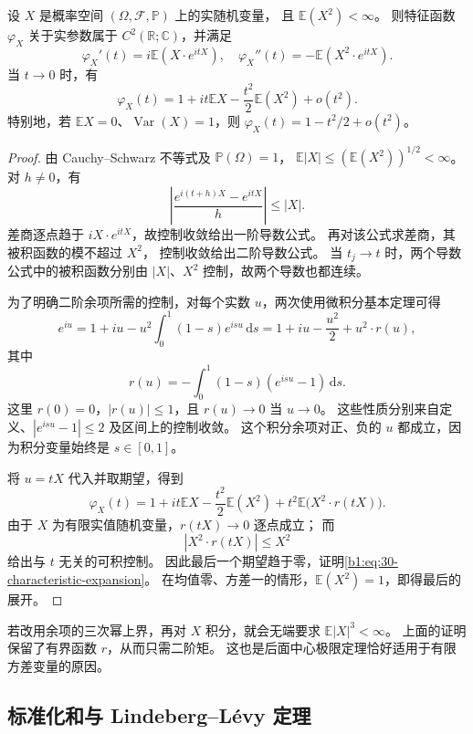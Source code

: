 \begin{proposition}\label{b1:prop:30-characteristic-second-order}
设 \(X\) 是概率空间 \((\Omega,\mathcal F,\mathbb P)\) 上的实随机变量，
且 \(\mathbb E(X^2)<\infty\)。
则特征函数 \(\varphi_X\) 关于实参数属于 \(C^2(\mathbb R;\mathbb C)\)，并满足
\[
 \varphi_X'(t)=i\mathbb E(X\cdot e^{itX}),
 \quad
 \varphi_X''(t)=-\mathbb E(X^2\cdot e^{itX}).
\]
当 \(t\to0\) 时，有
\begin{equation}\label{b1:eq:30-characteristic-expansion}
 \varphi_X(t)
 =1+it\mathbb EX-\frac{t^2}{2}\mathbb E(X^2)+o(t^2).
\end{equation}
特别地，若 \(\mathbb EX=0\)、\(\operatorname{Var}(X)=1\)，则
\(\varphi_X(t)=1-t^2/2+o(t^2)\)。
\end{proposition}
\begin{proof}
由 Cauchy--Schwarz 不等式及 \(\mathbb P(\Omega)=1\)，
\(\mathbb E|X|\leq(\mathbb E(X^2))^{1/2}<\infty\)。
对 \(h\ne0\)，有
\[
 \left|\frac{e^{i(t+h)X}-e^{itX}}{h}\right|\leq|X|.
\]
差商逐点趋于 \(iX\cdot e^{itX}\)，故控制收敛给出一阶导数公式。
再对该公式求差商，其被积函数的模不超过 \(X^2\)，
控制收敛给出二阶导数公式。
当 \(t_j\to t\) 时，两个导数公式中的被积函数分别由
\(|X|\)、\(X^2\) 控制，故两个导数也都连续。

为了明确二阶余项所需的控制，对每个实数 \(u\)，两次使用微积分基本定理可得
\[
 e^{iu}
 =1+iu-u^2\int_0^1(1-s)e^{isu}\,\mathrm ds
 =1+iu-\frac{u^2}{2}+u^2\cdot r(u),
\]
其中
\[
 r(u)=-\int_0^1(1-s)(e^{isu}-1)\,\mathrm ds.
\]
这里 \(r(0)=0\)，\(|r(u)|\leq1\)，且 \(r(u)\to0\) 当 \(u\to0\)。
这些性质分别来自定义、\(|e^{isu}-1|\leq2\) 及区间上的控制收敛。
这个积分余项对正、负的 \(u\) 都成立，因为积分变量始终是 \(s\in[0,1]\)。

将 \(u=tX\) 代入并取期望，得到
\[
 \varphi_X(t)
 =1+it\mathbb EX-\frac{t^2}{2}\mathbb E(X^2)
       +t^2\mathbb E\bigl(X^2\cdot r(tX)\bigr).
\]
由于 \(X\) 为有限实值随机变量，\(r(tX)\to0\) 逐点成立；
而
\[
 |X^2\cdot r(tX)|\leq X^2
\]
给出与 \(t\) 无关的可积控制。
因此最后一个期望趋于零，证明\eqref{b1:eq:30-characteristic-expansion}。
在均值零、方差一的情形，\(\mathbb E(X^2)=1\)，即得最后的展开。
\end{proof}

若改用余项的三次幂上界，再对 \(X\) 积分，就会无端要求
\(\mathbb E|X|^3<\infty\)。
上面的证明保留了有界函数 \(r\)，从而只需二阶矩。
这也是后面中心极限定理恰好适用于有限方差变量的原因。

\subsection{标准化和与 Lindeberg–Lévy 定理}
\label{b1:subsec:300702}

